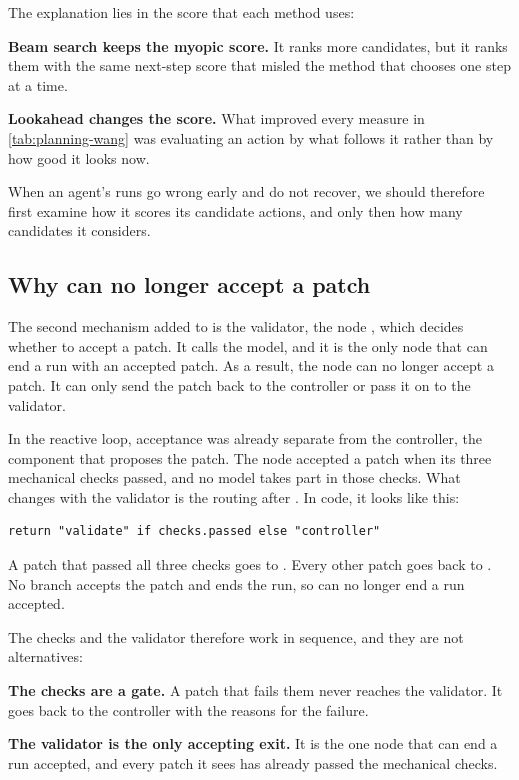The explanation lies in the score that each method uses:
\bi
\item \textbf{Beam search keeps the myopic score.} It ranks more candidates, but it ranks them with
the same next-step score that misled the method that chooses one step at a time.
\item \textbf{Lookahead changes the score.} What improved every measure in \cref{tab:planning-wang}
was evaluating an action by what follows it rather than by how good it looks now.
\ei

When an agent's runs go wrong early and do not recover, we should therefore first examine how it
scores its candidate actions, and only then how many candidates it considers.

\subsection{Why \texorpdfstring{}{submit} can no longer accept a patch}
\label{sec:validation}

The second mechanism added to \msa{} is the validator, the node , which decides
whether to accept a patch. It calls the model, and it is the only node that can end a run with an
accepted patch. As a result, the  node can no longer accept a patch. It can only
send the patch back to the controller or pass it on to the validator.

In the reactive loop, acceptance was already separate from the controller, the component that
proposes the patch. The  node accepted a patch when its three mechanical checks
passed, and no model takes part in those checks. What changes with the validator is the routing
after . In code, it looks like this:

\begin{lstlisting}[basicstyle=\ttfamily\footnotesize, caption={Routing after the submit node
(illustrative; the branch for the runtime's stops is omitted).}, label=lst:planning-after-submit]
return "validate" if checks.passed else "controller"
\end{lstlisting}

A patch that passed all three checks goes to . Every other patch goes back to
. No branch accepts the patch and ends the run, so  can no longer
end a run accepted.

The checks and the validator therefore work in sequence, and they are not alternatives:
\bi
\item \textbf{The checks are a gate.} A patch that fails them never reaches the validator. It goes
back to the controller with the reasons for the failure.
\item \textbf{The validator is the only accepting exit.} It is the one node that can end a run
accepted, and every patch it sees has already passed the mechanical checks.
\ei

